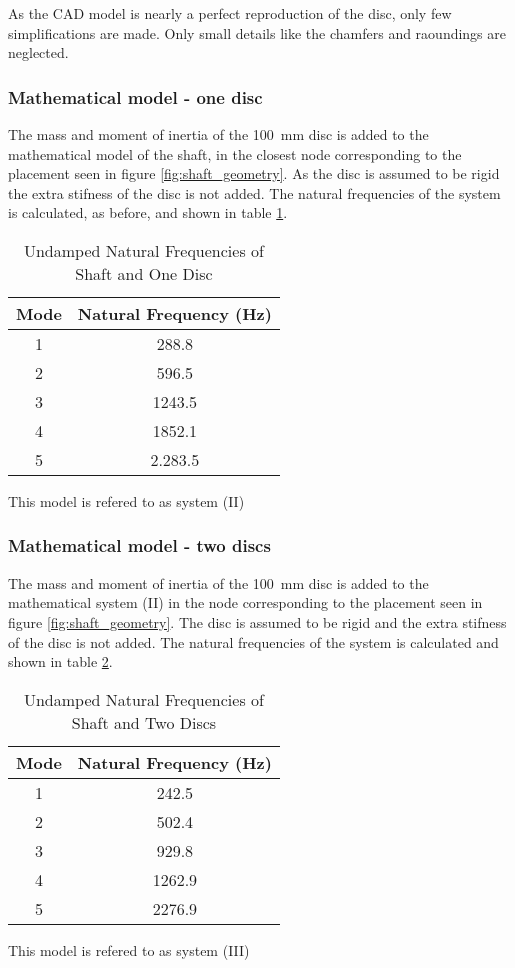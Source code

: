 As the CAD model is nearly a perfect reproduction of the disc, only few simplifications are made. Only small details like the chamfers and raoundings are neglected.

\subsubsection{Mathematical model - one disc}
The mass and moment of inertia of the \SI{100}{\milli \meter} disc is added to the mathematical model of the shaft, in the closest node corresponding to the placement seen in figure \ref{fig:shaft_geometry}.
As the disc is assumed to be rigid the extra stifness of the disc is not added. The natural frequencies of the system is calculated, as before, and shown in table \ref{tab:natural_freq_one_disc}.
\begin{table}[ht]
    \centering
    \caption{Undamped Natural Frequencies of Shaft and One Disc}
    \label{tab:natural_freq_one_disc}
    \begin{tabular}{@{}cc@{}}
        \toprule
        Mode    &   Natural Frequency (\si{\hertz})    \\ \midrule
        1       &   288.8   \\
        2       &   596.5   \\
        3       &   1243.5  \\
        4       &   1852.1  \\ 
        5       &   2.283.5 \\ \bottomrule
    \end{tabular}
\end{table}
This model is refered to as system (II)

\subsubsection{Mathematical model - two discs}
The mass and moment of inertia of the \SI{100}{\milli \meter} disc is added to the mathematical system (II) in the node corresponding to the placement seen in figure \ref{fig:shaft_geometry}.
The disc is assumed to be rigid and the extra stifness of the disc is not added. The natural frequencies of the system is calculated and shown in table \ref{tab:natural_freq_two_discs}.
\begin{table}[ht]
    \centering
    \caption{Undamped Natural Frequencies of Shaft and Two Discs}
    \label{tab:natural_freq_two_discs}
    \begin{tabular}{@{}cc@{}}
        \toprule
        Mode    &   Natural Frequency (\si{\hertz})    \\ \midrule
        1       &   242.5   \\
        2       &   502.4   \\
        3       &   929.8  \\
        4       &   1262.9  \\ 
        5       &   2276.9 \\ \bottomrule
    \end{tabular}
\end{table}
This model is refered to as system (III)

